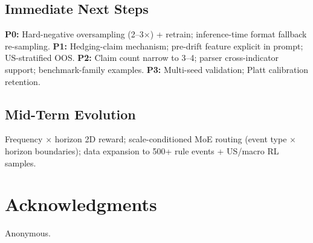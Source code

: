\documentclass[sigconf, anonymous, review]{acmart}
\begin{document}
\subsection{Immediate Next Steps}

\textbf{P0:} Hard-negative oversampling (2--3$\times$) + retrain; inference-time format fallback re-sampling.
\textbf{P1:} Hedging-claim mechanism; pre-drift feature explicit in prompt; US-stratified OOS.
\textbf{P2:} Claim count narrow to 3--4; parser cross-indicator support; benchmark-family examples.
\textbf{P3:} Multi-seed validation; Platt calibration retention.

\subsection{Mid-Term Evolution}

Frequency $\times$ horizon 2D reward; scale-conditioned MoE routing (event type $\times$ horizon boundaries); data expansion to 500+ rule events + US/macro RL samples.

\section*{Acknowledgments}

Anonymous.
\end{document}
